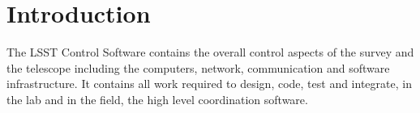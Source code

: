 \section{Introduction} \label{sec:intro}

The LSST Control Software contains the overall control aspects of the survey and the telescope including the 
computers, network, communication and software infrastructure. It contains all work required to design, code, 
test and integrate, in the lab and in the field, the high level coordination software.
